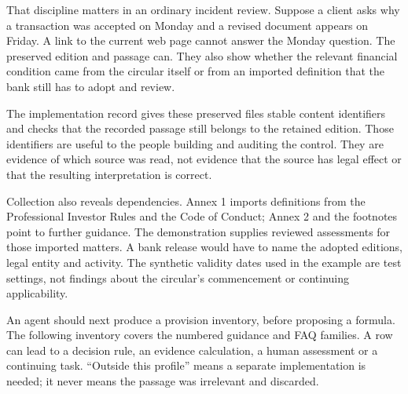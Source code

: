 That discipline matters in an ordinary incident review. Suppose a client asks
why a transaction was accepted on Monday and a revised document appears on
Friday. A link to the current web page cannot answer the Monday question. The
preserved edition and passage can. They also show whether the relevant financial
condition came from the circular itself or from an imported definition that the
bank still has to adopt and review.

The implementation record gives these preserved files stable content
identifiers and checks that the recorded passage still belongs to the retained
edition. Those identifiers are useful to the people building and auditing the
control. They are evidence of which source was read, not evidence that the source
has legal effect or that the resulting interpretation is correct.

Collection also reveals dependencies. Annex 1 imports definitions from the
Professional Investor Rules and the Code of Conduct; Annex 2 and the footnotes
point to further guidance. The demonstration supplies reviewed assessments for
those imported matters. A bank release would have to name the adopted editions,
legal entity and activity. The synthetic validity dates used in the example are
test settings, not findings about the circular's commencement or continuing
applicability.

An agent should next produce a provision inventory, before proposing a formula.
The following inventory covers the numbered guidance and FAQ families. A row
can lead to a decision rule, an evidence calculation, a human assessment or a
continuing task. ``Outside this profile'' means a separate implementation is
needed; it never means the passage was irrelevant and discarded.


